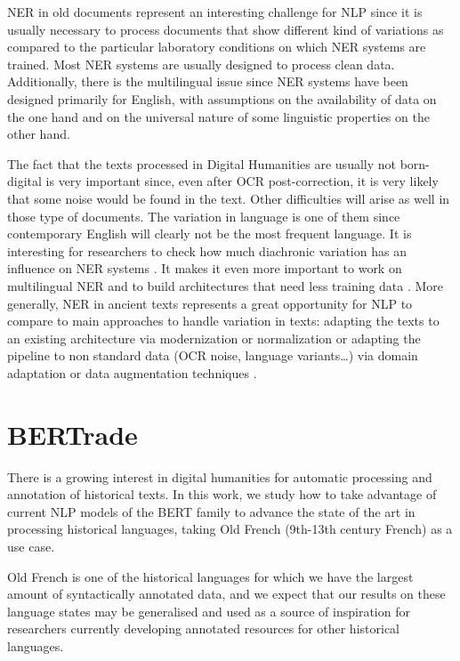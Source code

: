 NER in old documents represent an interesting challenge for NLP since it is usually necessary to process documents that show different kind of variations as compared to the particular laboratory conditions on which NER systems are trained.
Most NER systems are usually designed to process clean data.
Additionally, there is the multilingual issue since NER systems have been designed primarily for English, with assumptions on the availability of data on the one hand and on the universal nature of some linguistic properties on the other hand.

The fact that the texts processed in Digital Humanities are usually not born-digital is very important since, even after OCR post-correction, it is very likely that some noise would be found in the text.
Other difficulties will arise as well in those type of documents. The variation in language is one of them since contemporary English will clearly not be the most frequent language.  It is interesting for researchers to check how much diachronic variation has an influence on NER systems \cite{ehrmann-etal-2016-diachronic}.
It makes it even more important to work on multilingual NER and to build architectures that need less training data \cite{rahimi-etal-2019-massively}.
More generally, NER in ancient texts represents a great opportunity for NLP to compare to main approaches to handle variation in texts: adapting the texts to an existing architecture via modernization or normalization \cite{leaman-etal-2016-taggerone} or adapting the pipeline to non standard data (OCR noise, language variants\dots) via domain adaptation or data augmentation techniques \cite{ghannay-etal-2018-end}.


\section{BERTrade}

There is a growing interest in digital humanities for automatic processing and annotation of historical texts. In this work, we study how to take advantage of current NLP models of the BERT family to advance the state of the art in processing historical languages, taking Old French (9th-13th century French) as a use case.

Old French is one of the historical languages for which we have the largest amount of syntactically annotated data, and we expect that our results on these language states may be generalised and used as a source of inspiration for researchers currently developing annotated resources for other historical languages.

